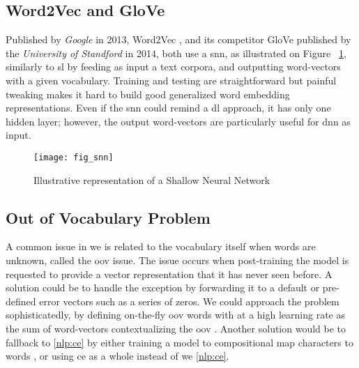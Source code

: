 \subsection{Word2Vec and GloVe}
\label{nlp:word2vec}
Published by \textit{Google} in 2013, Word2Vec \autocite{paper:word2vec}, and its competitor GloVe \autocite{paper:glove} published by the \textit{University of Standford} in 2014, both use a \gls{snn}, as illustrated on Figure ~\ref{fig:fig_snn}, similarly to \gls{sl} by feeding as input a text corpora, and outputting word-vectors with a given vocabulary. Training and testing are straightforward but painful tweaking makes it hard to build good generalized word embedding representations. Even if the \gls{snn} could remind a \gls{dl} approach, it has only one hidden layer; however, the output word-vectors are particularly useful for \gls{dnn} as input.

\begin{figure}
    \centering
    \texttt{[image: fig\_snn]}
    \caption{Illustrative representation of a Shallow Neural Network}
    \label{fig:fig_snn}
\end{figure}

\subsection{Out of Vocabulary Problem}
\label{nlp:oov}
A common issue in \gls{we} is related to the vocabulary itself when words are unknown, called the \gls{oov} issue. The issue occurs when post-training the model is requested to provide a vector representation that it has never seen before. A solution could be to handle the exception by forwarding it to a default or pre-defined error vectors such as a series of zeros. We could approach the problem sophisticatedly, by defining on-the-fly \gls{oov} words with at a high learning rate as the sum of word-vectors contextualizing the \gls{oov}  \autocite{paper:journals/corr/HerbelotB17}. Another solution would be to fallback to \ref{nlp:ce} by either training a model to compositional map characters to words \autocite{paper:journals/corr/PinterGE17}, or using \gls{ce} as a whole instead of \gls{we} \ref{nlp:ce}.


